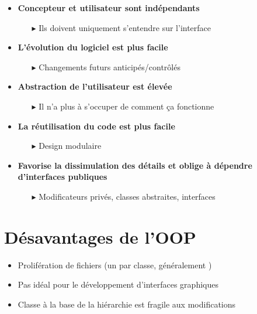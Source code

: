 \documentclass[16pt]{report}
\begin{document}
\begin{multicols*}{2}
        \begin{itemize}
            \item \textbf{Concepteur et utilisateur sont indépendants}
                \begin{itemize}
                    \item[$\blacktriangleright$] Ils doivent uniquement s’entendre sur \textcolor{myb}{l’interface}
                \end{itemize}
            \item \textbf{L’évolution du logiciel est plus facile}
                \begin{itemize}
                    \item[$\blacktriangleright$] Changements futurs anticipés/contrôlés
                \end{itemize}
            \item \textbf{Abstraction de l’utilisateur est élevée}
                \begin{itemize}
                    \item[$\blacktriangleright$] Il n’a plus à s’occuper de comment ça fonctionne
                \end{itemize}
            \item \textbf{La réutilisation du code est plus facile}
                \begin{itemize}
                    \item[$\blacktriangleright$] Design modulaire
                \end{itemize}
            \item \textbf{Favorise la dissimulation des détails et oblige à dépendre d’interfaces publiques}
                \begin{itemize}
                    \item[$\blacktriangleright$] Modificateurs privés, classes abstraites, interfaces                
                \end{itemize}
        \end{itemize}


        \section{Désavantages de l'OOP}

        \begin{itemize}
            \item Prolifération de fichiers (un par classe, généralement )
            \item Pas idéal pour le développement d’interfaces graphiques
            \item Classe à la base de la hiérarchie est fragile aux modifications
        \end{itemize}



\end{multicols*}
\end{document}
